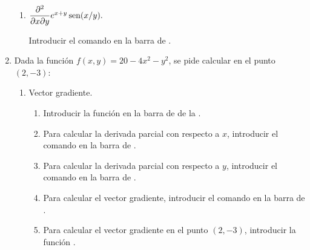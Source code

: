 \begin{enumerate}[leftmargin=*]
\begin{enumerate}
      \item  $\dfrac{\partial ^{2}}{\partial x\partial y}e^{x+y}\operatorname{sen}(x/y).$
            \begin{indication}
            Introducir el comando  en la barra de .
            \end{indication}
      \end{enumerate}

\item Dada la función $f(x,y)=20-4x^2-y^2$, se pide calcular en el punto $(2,-3)$:
      \begin{enumerate}
      \item Vector gradiente.
            \begin{indication}
            \begin{enumerate}
            \item Introducir la función  en la barra de  de la .
            \item Para calcular la derivada parcial con respecto a $x$, introducir el comando  en la barra de .
            \item Para calcular la derivada parcial con respecto a $y$, introducir el comando  en la barra de .
            \item Para calcular el vector gradiente, introducir el comando  en la barra de .
            \item Para calcular el vector gradiente en el punto $(2,-3)$, introducir la función .
            \end{enumerate}
            \end{indication}


\end{enumerate}
\end{enumerate}
